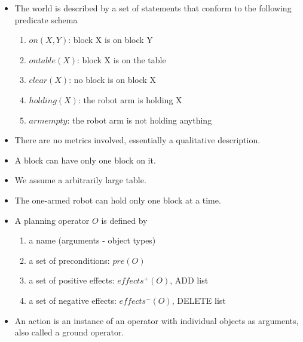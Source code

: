 \documentclass[a4paper]{article}
\begin{document}
\begin{itemize}
    \item The world is described by a set of statements that conform to the following predicate schema
    \begin{enumerate}
        \item $on(X,Y)$: block X is on block Y
        \item $ontable(X)$: block X is on the table
        \item $clear(X)$: no block is on block X
        \item $holding(X)$: the robot arm is holding X
        \item $armempty$: the robot arm is not holding anything
    \end{enumerate}
    \item There are no metrics involved, essentially a qualitative description.
    \item A block can have only one block on it.
    \item We assume a arbitrarily large table.
    \item The one-armed robot can hold only one block at a time.
    \item A planning operator $O$ is defined by
    \begin{enumerate}
        \item a name (arguments - object types)
        \item a set of preconditions: $pre(O)$
        \item a set of positive effects: $effects^+(O)$, ADD list
        \item a set of negative effects: $effects^-(O)$, DELETE list
    \end{enumerate}
    \item An action is an instance of an operator with individual objects as arguments, also called a ground operator.
    \begin{figure}[H]
        \centering
\end{figure}
\end{itemize}
\end{document}
